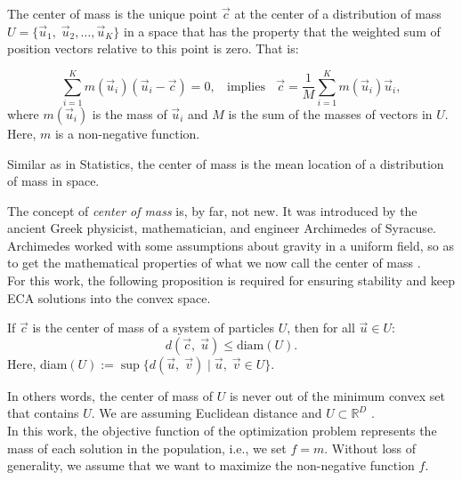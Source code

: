 \documentclass[graybox]{svmult}
\begin{document}
\begin{definition}
	The center of mass is the unique point $\vec{c}$ at the center of a distribution
	of mass $U = \{\vec{u}_1,\; \vec{u}_2 , \ldots , \vec{u}_K \}$ in a space that 
	has the property that the weighted sum of position vectors relative to this point 
	is zero. That is:

	\begin{equation}
		\sum_{i = 1}^K m(\vec{u}_i) (\vec{u}_i - \vec{c}) = 0, \;\; \text{ implies } \;\; 
		\vec{c} = \dfrac{1}{M} \sum_{i = 1}^K  m(\vec{u}_i)  \vec{u}_i,
		\label{eq:masscenter}
	\end{equation}
	where $m(\vec{u}_i)$ is the mass of $\vec{u}_i$ and  $M$ is the sum of the 
	masses of vectors in $U$. Here, $m$ is a non-negative function.
\end{definition}
%
%
\begin{note}
Similar as in Statistics, the center of mass is the mean location of a distribution 
of mass in space.
\end{note}
% 
The concept of \textit{center of mass} is, by far, not new. It was introduced by the ancient 
Greek physicist, mathematician, and engineer Archimedes of Syracuse. Archimedes 
worked with some assumptions about gravity in a uniform field, so as to 
get the mathematical properties of what we now call the center of mass \cite{kleppner73}.\\

For this work, the following proposition is required for ensuring stability and keep ECA 
solutions into the convex space.

\begin{proposition}
	If $\vec{c}$ is the center of mass of a system of particles $U$, 
	then  for all $ \vec{u}\in U $:
	$$  d(\vec{c},\; \vec{u} )  \leq \text{diam}(U). $$
	Here, diam$(U) := \sup\{ d(\vec{u},\; \vec{v} ) \; | \; \vec{u} ,\; \vec{v} \in U \}$.
\end{proposition}
%
\noindent
In others words, the center of mass of $U$ is never out of the minimum convex set that 
contains $U$. We are assuming Euclidean distance and $U \subset \mathbb{R}^D$ \cite{rudin}.\\

%
% 
%

In this work, the objective function of the optimization problem represents 
the mass of each solution in the population,  i.e., we set $f = m$. 
Without loss of generality, we assume that we want to maximize 
the non-negative function $f$.
\end{document}
